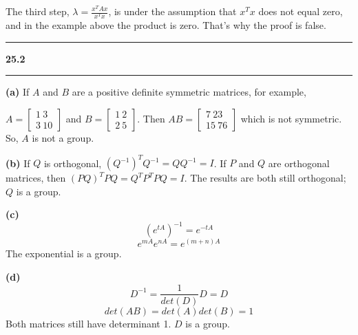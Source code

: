 \documentclass[11pt]{article}
\newcommand\question[2]{\vspace{.25in}\hrule\textbf{#1 #2}\vspace{.5em}\hrule\vspace{.10in}}
\renewcommand\part[1]{\vspace{.10in}\textbf{(#1)}}
\begin{document}
The third step, \(\lambda = \frac{x^TAx}{x^Tx}\), is under the assumption that \(x^Tx\) does not equal zero, and in the example above the product is zero. That's why the proof is false.

\question{25.2}{}
\part{a} If \(A\) and \(B\) are a positive definite symmetric matrices, for example, 

\(A = \begin{bmatrix} 1 \ 3 \\ 3 \ 10 \end{bmatrix}\) and \(B = \begin{bmatrix} 1 \ 2 \\ 2 \ 5 \end{bmatrix}\).
Then \(AB = \begin{bmatrix} 7 \ 23 \\ 15 \ 76 \end{bmatrix}\) which is not symmetric. So, \(A\) is not a group.

\part{b} If \(Q\) is orthogonal, \((Q^{-1})^TQ^{-1} = QQ^{-1} = I\). If \(P\) and \(Q\) are orthogonal matrices, then \((PQ)^TPQ = Q^TP^TPQ = I\). The results are both still orthogonal; \(Q\) is a group.

\part{c} 
$$(e^{tA})^{-1} = e^{-tA}$$
$$e^{mA}e^{nA} = e^{(m+n)A}$$ 
The exponential is a group.

\part{d} 
$$D^{-1} = \frac{1}{det(D)}D = D$$
$$det(AB) = det(A)det(B) = 1$$
Both matrices still have determinant 1. \(D\) is a group.
\end{document}
